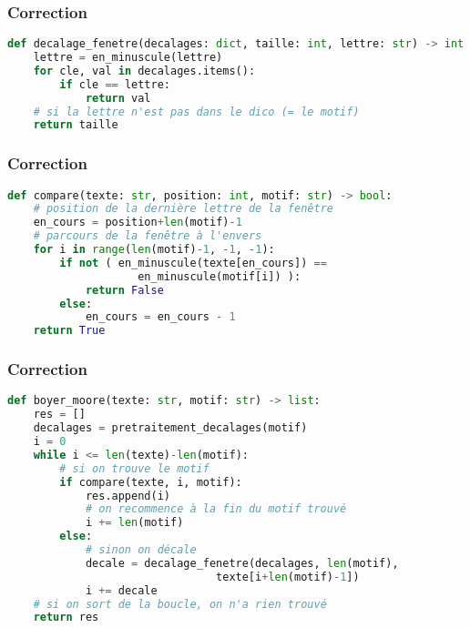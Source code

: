 \documentclass[svgnames,11pt]{beamer}
\begin{document}
\begin{frame}[fragile]
    \frametitle{Correction}

    \begin{center}
    \begin{lstlisting}[language=Python , basicstyle=\ttfamily\small, xleftmargin=0.2em, xrightmargin=-2em]
def decalage_fenetre(decalages: dict, taille: int, lettre: str) -> int:
    lettre = en_minuscule(lettre)
    for cle, val in decalages.items():
        if cle == lettre:
            return val
    # si la lettre n'est pas dans le dico (= le motif)
    return taille  
\end{lstlisting}
    \end{center}

\end{frame}
\begin{frame}[fragile]
    \frametitle{Correction}

    \begin{center}
    \begin{lstlisting}[language=Python , basicstyle=\ttfamily\small, xleftmargin=0.2em, xrightmargin=-4em]
def compare(texte: str, position: int, motif: str) -> bool:
    # position de la dernière lettre de la fenêtre
    en_cours = position+len(motif)-1
    # parcours de la fenêtre à l'envers
    for i in range(len(motif)-1, -1, -1):
        if not ( en_minuscule(texte[en_cours]) == 
                    en_minuscule(motif[i]) ):
            return False
        else:
            en_cours = en_cours - 1
    return True
\end{lstlisting}
    \end{center}

\end{frame}
\begin{frame}[fragile]
    \frametitle{Correction}

    \begin{center}
    \begin{lstlisting}[language=Python , basicstyle=\ttfamily\small, xleftmargin=0.2em, xrightmargin=-4em]
def boyer_moore(texte: str, motif: str) -> list:
    res = []
    decalages = pretraitement_decalages(motif)
    i = 0
    while i <= len(texte)-len(motif):
        # si on trouve le motif
        if compare(texte, i, motif):
            res.append(i)
            # on recommence à la fin du motif trouvé
            i += len(motif)
        else:
            # sinon on décale
            decale = decalage_fenetre(decalages, len(motif), 
                                texte[i+len(motif)-1])
            i += decale
    # si on sort de la boucle, on n'a rien trouvé
    return res
\end{lstlisting}
    \end{center}

\end{frame}
\end{document}

